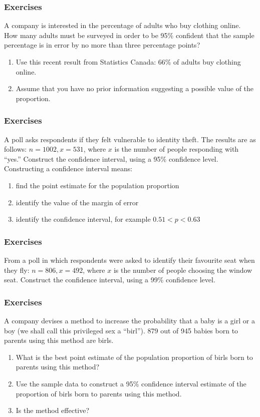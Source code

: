 \documentclass[xcolor=dvipsnames]{beamer}
\begin{document}
\begin{frame}
  \frametitle{Exercises}
  {\ubung} A company is interested in the percentage of adults who buy
  clothing online. How many adults must be surveyed in order to be
  95\% confident that the sample percentage is in error by no more
  than three percentage points?
  \begin{enumerate}
  \item Use this recent result from Statistics Canada: 66\% of adults
    buy clothing online.
  \item Assume that you have no prior information suggesting a
    possible value of the proportion.
  \end{enumerate}
\end{frame}

\begin{frame}
  \frametitle{Exercises}
  {\ubung} A poll asks respondents if they felt vulnerable to identity
  theft. The results are as follows: $n=1002,x=531$, where $x$ is the
  number of people responding with ``yes.'' Construct the confidence
  interval, using a 95\% confidence level. Constructing a confidence
  interval means:
  \begin{enumerate}
  \item find the point estimate for the population proportion
  \item identify the value of the margin of error
  \item identify the confidence interval, for example $0.51<p<0.63$
  \end{enumerate}
\end{frame}

\begin{frame}
  \frametitle{Exercises}
{\ubung} From a poll in which respondents were asked to identify their
favourite seat when they fly: $n=806,x=492$, where $x$ is the number
of people choosing the window seat. Construct the confidence
  interval, using a 99\% confidence level. 
\end{frame}

\begin{frame}
  \frametitle{Exercises}
  {\ubung} A company devises a method to increase the probability that a baby
  is a girl or a boy (we shall call this privileged sex a ``birl'').
  879 out of 945 babies born to parents using this method are birls. 
  \begin{enumerate}
  \item What is the best point estimate of the population proportion
    of birls born to parents using this method?
  \item Use the sample data to construct a 95\% confidence interval
    estimate of the proportion of birls born to parents using this
    method.
  \item Is the method effective?
  \end{enumerate}
\end{frame}
\end{document}
